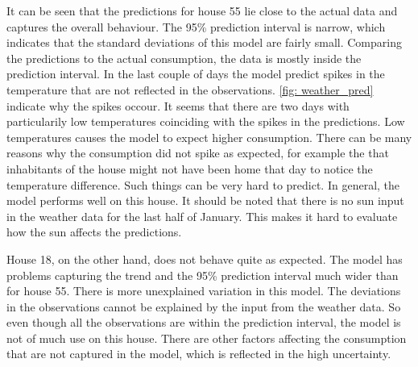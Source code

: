 \noindent It can be seen that the predictions for house 55 lie close to the actual data and captures the overall behaviour.  The 95\% prediction interval is narrow, which indicates that the standard deviations of this model are fairly small. Comparing the predictions to the actual consumption, the data is mostly inside the prediction interval. In the last couple of days the model predict spikes in the temperature that are not reflected in the observations. \cref{fig: weather_pred} indicate why the spikes occour. It seems that there are two days with particularily low temperatures coinciding with the spikes in the predictions. Low temperatures causes the model to expect higher consumption. There can be many reasons why the consumption did not spike as expected, for example the that inhabitants of the house might not have been home that day to notice the temperature difference. Such things can be very hard to predict. In general, the model performs well on this house. It should be noted that there is no sun input in the weather data for the last half of January. This makes it hard to evaluate how the sun affects the predictions.

\noindent House 18, on the other hand, does not behave quite as expected. The model has problems capturing the trend and the 95\% prediction interval much wider than for house 55. There is more unexplained variation in this model. The deviations in the observations cannot be explained by the input from the weather data. So even though all the observations are within the prediction interval, the model is not of much use on this house. There are other factors affecting the consumption that are not captured in the model, which is reflected in the high uncertainty.\\

